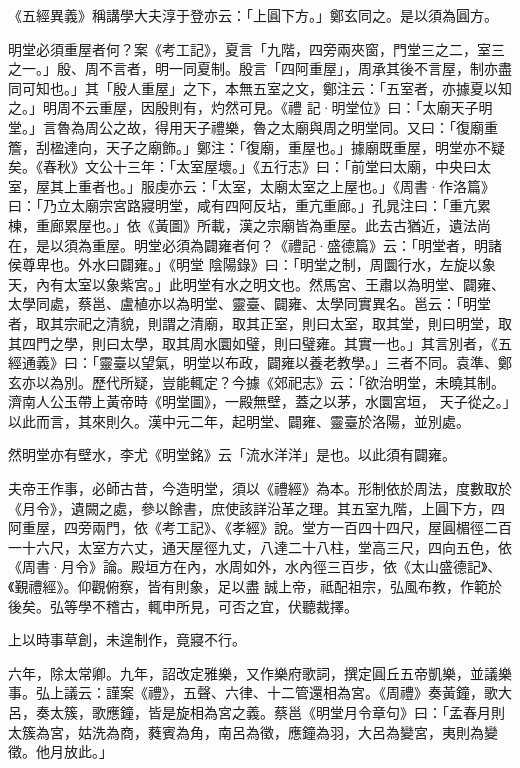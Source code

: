 \begin{pinyinscope}
 《五經異義》稱講學大夫淳于登亦云：「上圓下方。」鄭玄同之。是以須為圓方。



 明堂必須重屋者何？案《考工記》，夏言「九階，四旁兩夾窗，門堂三之二，室三之一。」殷、周不言者，明一同夏制。殷言「四阿重屋」，周承其後不言屋，制亦盡同可知也。」其「殷人重屋」之下，本無五室之文，鄭注云：「五室者，亦據夏以知之。」明周不云重屋，因殷則有，灼然可見。《禮
 記·明堂位》曰：「太廟天子明堂。」言魯為周公之故，得用天子禮樂，魯之太廟與周之明堂同。又曰：「復廟重簷，刮楹達向，天子之廟飾。」鄭注：「復廟，重屋也。」據廟既重屋，明堂亦不疑矣。《春秋》文公十三年：「太室屋壞。」《五行志》曰：「前堂曰太廟，中央曰太室，屋其上重者也。」服虔亦云：「太室，太廟太室之上屋也。」《周書·作洛篇》曰：「乃立太廟宗宮路寢明堂，咸有四阿反坫，重亢重廊。」孔晁注曰：「重亢累棟，重廊累屋也。」依《黃圖》所載，漢之宗廟皆為重屋。此去古猶近，遺法尚在，是以須為重屋。明堂必須為闢雍者何？《禮記·盛德篇》云：「明堂者，明諸侯尊卑也。外水曰闢雍。」《明堂
 陰陽錄》曰：「明堂之制，周圜行水，左旋以象天，內有太室以象紫宮。」此明堂有水之明文也。然馬宮、王肅以為明堂、闢雍、太學同處，蔡邕、盧植亦以為明堂、靈臺、闢雍、太學同實異名。邕云：「明堂者，取其宗祀之清貌，則謂之清廟，取其正室，則曰太室，取其堂，則曰明堂，取其四門之學，則曰太學，取其周水圜如璧，則曰璧雍。其實一也。」其言別者，《五經通義》曰：「靈臺以望氣，明堂以布政，闢雍以養老教學。」三者不同。袁準、鄭玄亦以為別。歷代所疑，豈能輒定？今據《郊祀志》云：「欲治明堂，未曉其制。濟南人公玉帶上黃帝時《明堂圖》，一殿無壁，蓋之以茅，水圜宮垣，
 天子從之。」以此而言，其來則久。漢中元二年，起明堂、闢雍、靈臺於洛陽，並別處。



 然明堂亦有壁水，李尤《明堂銘》云「流水洋洋」是也。以此須有闢雍。



 夫帝王作事，必師古昔，今造明堂，須以《禮經》為本。形制依於周法，度數取於《月令》，遺闕之處，參以餘書，庶使該詳沿革之理。其五室九階，上圓下方，四阿重屋，四旁兩門，依《考工記》、《孝經》說。堂方一百四十四尺，屋圓楣徑二百一十六尺，太室方六丈，通天屋徑九丈，八達二十八柱，堂高三尺，四向五色，依《周書·月令》論。殿垣方在內，水周如外，水內徑三百步，依《太山盛德記》、《覲禮經》。仰觀俯察，皆有則象，足以盡
 誠上帝，祗配祖宗，弘風布教，作範於後矣。弘等學不稽古，輒申所見，可否之宜，伏聽裁擇。



 上以時事草創，未遑制作，竟寢不行。



 六年，除太常卿。九年，詔改定雅樂，又作樂府歌詞，撰定圓丘五帝凱樂，並議樂事。弘上議云：謹案《禮》，五聲、六律、十二管還相為宮。《周禮》奏黃鐘，歌大呂，奏太簇，歌應鐘，皆是旋相為宮之義。蔡邕《明堂月令章句》曰：「孟春月則太簇為宮，姑洗為商，蕤賓為角，南呂為徵，應鐘為羽，大呂為變宮，夷則為變徵。他月放此。」




\end{pinyinscope}
